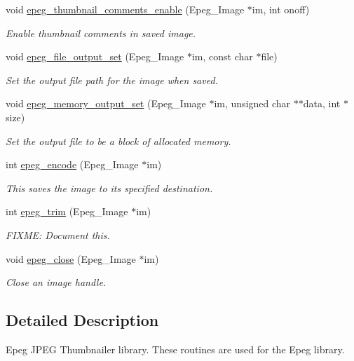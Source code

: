 \begin{DoxyCompactItemize}
void \hyperlink{epeg_8c_a5cfe689f77dbe7b120317a195585ee51}{epeg\-\_\-thumbnail\-\_\-comments\-\_\-enable} (Epeg\-\_\-\-Image $\ast$im, int onoff)
\begin{DoxyCompactList}\small\item\em Enable thumbnail comments in saved image. \end{DoxyCompactList}\item 
void \hyperlink{epeg_8c_a4aa4c7bbf3edf1f24603d3b4dad684b4}{epeg\-\_\-file\-\_\-output\-\_\-set} (Epeg\-\_\-\-Image $\ast$im, const char $\ast$file)
\begin{DoxyCompactList}\small\item\em Set the output file path for the image when saved. \end{DoxyCompactList}\item 
void \hyperlink{epeg_8c_ae0e91c160074e6d96b7e366fb0eb6ec8}{epeg\-\_\-memory\-\_\-output\-\_\-set} (Epeg\-\_\-\-Image $\ast$im, unsigned char $\ast$$\ast$data, int $\ast$size)
\begin{DoxyCompactList}\small\item\em Set the output file to be a block of allocated memory. \end{DoxyCompactList}\item 
int \hyperlink{epeg_8c_a12a018084510ebdc0e627f56305fea79}{epeg\-\_\-encode} (Epeg\-\_\-\-Image $\ast$im)
\begin{DoxyCompactList}\small\item\em This saves the image to its specified destination. \end{DoxyCompactList}\item 
int \hyperlink{epeg_8c_a327dab144744ba5f1892643d627e6df0}{epeg\-\_\-trim} (Epeg\-\_\-\-Image $\ast$im)
\begin{DoxyCompactList}\small\item\em F\-I\-X\-M\-E\-: Document this. \end{DoxyCompactList}\item 
void \hyperlink{epeg_8c_a8faf0f0fab47ac97b86ee7e00e1bee7c}{epeg\-\_\-close} (Epeg\-\_\-\-Image $\ast$im)
\begin{DoxyCompactList}\small\item\em Close an image handle. \end{DoxyCompactList}\end{DoxyCompactItemize}


\subsection{Detailed Description}
Epeg J\-P\-E\-G Thumbnailer library. These routines are used for the Epeg library. 

